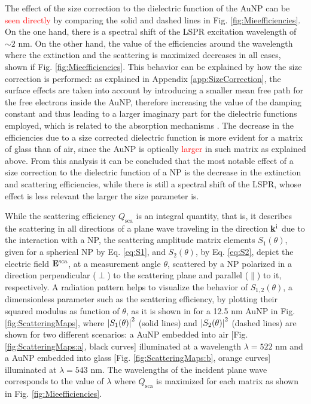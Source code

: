 The effect of the size correction to the dielectric function of the AuNP can be \textcolor{red}{seen directly} by comparing the solid and dashed lines in Fig. \ref{fig:Mieefficiencies}. On the one hand, there is a spectral shift of the LSPR excitation wavelength  of $\sim 2$ nm. On the other hand, the value of the efficiencies around the wavelength where the extinction and the scattering is maximized decreases in all cases, shown if Fig. \ref{fig:Mieefficiencies}.  This behavior can be explained by how the size correction is performed: as explained in Appendix \ref{app:SizeCorrection}, the surface effects are taken into account by introducing a smaller mean free path for the free electrons inside the AuNP, therefore increasing the value of the damping constant and thus leading to a larger imaginary part for the dielectric functions employed, which is related to the absorption mechanisms \cite{ibach_solid-state_2009}. The decrease in the efficiencies due to a size corrected dielectric function is more evident for a matrix of glass than of air, since the AuNP is optically \textcolor{red}{larger} in such matrix as explained above.  From this analysis it can be concluded that the most notable effect of a size correction to the dielectric function of a NP is the decrease in the extinction and scattering efficiencies, while there is still a spectral shift of the LSPR, whose effect is less relevant the larger the size parameter is.

While the scattering efficiency $Q_\text{sca}$ is an integral quantity, that is, it describes the scattering in all directions of a plane wave traveling in the  direction $\vb{k}^\text{i}$ due to the interaction with a NP, the scattering amplitude matrix elements $S_1(\theta)$,  given  for a spherical NP by Eq. \eqref{eq:S1}, and  $S_2(\theta)$, by Eq. \eqref{eq:S2}, depict the  electric field $\vb{E}^\text{sca}$, at a measurement angle $\theta$,  scattered by a NP polarized in a direction perpendicular ($\perp$) to the scattering plane and parallel ($\parallel$) to it, respectively. A radiation pattern helps to visualize the behavior of $S_{1,2}(\theta)$, a dimensionless parameter such as the scattering efficiency, by plotting their squared modulus as function of $\theta$, as it is shown in for a 12.5 nm AuNP in Fig. \ref{fig:ScatteringMaps}, where $\abs{S_{1}(\theta)}^2$ (solid lines) and $\abs{S_2(\theta)}^2$ (dashed lines) are shown for two different scenarios: a AuNP embedded into air [Fig. \ref{fig:ScatteringMaps:a}, black curves]  illuminated  at a wavelength $\lambda = 522$ nm and a AuNP embedded into glass  [Fig. \ref{fig:ScatteringMaps:b}, orange curves]  illuminated at $\lambda = 543$ nm. The wavelengths of the incident plane wave corresponds to the value of $\lambda$ where $Q_\text{sca}$ is maximized for each matrix as shown in Fig. \ref{fig:Mieefficiencies}.

